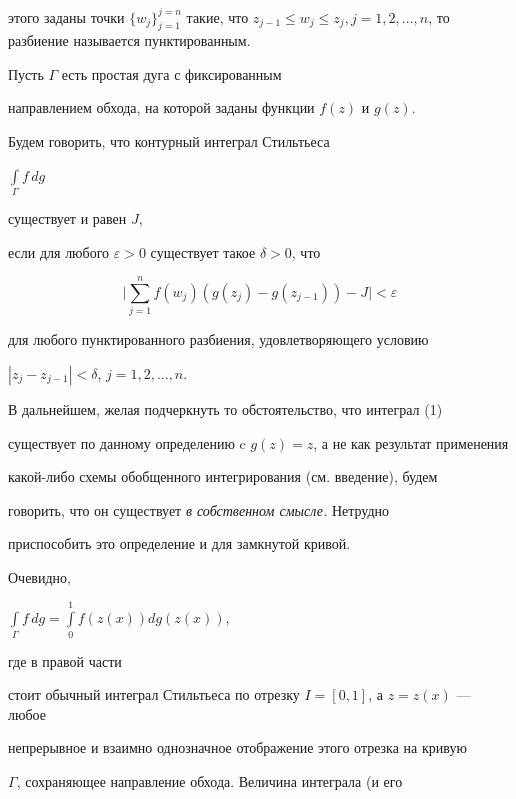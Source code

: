 этого заданы точки $\{w_j\}_{j=1}^{j=n}$ такие, что $z_{j-1}\le w_j\le z_j,


j=1,2,\dots,n$, то разбиение называется пунктированным.





\begin{defn}


Пусть $\Gamma$ есть простая дуга с фиксированным


направлением обхода, на которой заданы функции $f(z)$ и $g(z)$.


Будем говорить, что контурный интеграл Стильтьеса


$\int\limits_{\Gamma}{f\,dg}$


существует и равен $J$,


если для любого $\varepsilon > 0$ существует такое $\delta >0$, что


$$


\bigg|\sum_{j=1}^{n} f(w_j)(g(z_j) - g(z_{j-1}))-J\bigg| <\varepsilon


$$


для любого пунктированного разбиения, удовлетворяющего условию


$|z_j - z_{j-1}| < \delta$, $j=1,2,\dotsc,n$.


\end{defn}





В дальнейшем, желая подчеркнуть то обстоятельство, что интеграл (1)


существует по данному определению c $g(z)=z$, а не как результат применения


какой-либо схемы обобщенного интегрирования (см. введение), будем


говорить, что он существует {\it в собственном смысле.} Нетрудно


приспособить это определение и для замкнутой кривой.





Очевидно,


$\int\limits_{\Gamma}f\,dg=\int\limits_0^1 f(z(x))dg(z(x))$,


где в правой части


стоит обычный интеграл Стильтьеса по отрезку $I=[0,1]$, а $z=z(x)$ --- любое


непрерывное и взаимно однозначное отображение этого отрезка на кривую


$\Gamma$, сохраняющее направление обхода. Величина интеграла (и его


